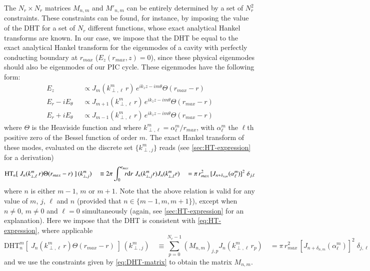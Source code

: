 The $N_r\times N_r$ matrices $M_{n,m}$ and $M'_{n,m}$ can be entirely
determined by a set of $N_r^2$ constraints. These
constraints can be found, for instance, by imposing the value of the
DHT for a set of $N_r$ different functions, whose exact analytical Hankel
transforms are known. In our case, we impose that the DHT be equal to the exact analytical
Hankel transform for the eigenmodes of a cavity with
perfectly conducting boundary at $r_{max}$ ($E_z(r_{max},z) =
0$), since these physical eigenmodes should also be eigenmodes of our
PIC cycle. These eigenmodes have the following form:
\begin{align*}
E_z \;& \; \propto  J_m(k^m_{\perp,\ell} \,r)\,e^{ik_z z -im\theta} \Theta(r_{max}-r) \\
E_r -i E_\theta \;& \; \propto  J_{m+1}(k^m_{\perp,\ell} \,r) \,e^{ik_z z -im\theta} \Theta(r_{max}-r)\\
E_r +i E_\theta \;& \; \propto  J_{m-1}(k^m_{\perp,\ell} \,r)
                    \,e^{ik_z z -im\theta} \Theta(r_{max}-r) 
\end{align*}
where $\Theta$ is the Heaviside function and where $k^m_{\perp,\ell} =
\alpha^m_\ell / r_{max}$, with $\alpha^m_\ell$ the $\ell$th positive zero of
the Bessel function of order $m$. 
The exact Hankel transform of these modes, evaluated on the discrete set
$\{k^m_{\perp,j} \}$ reads (see \ref{sec:HT-expression} for a derivation)
\begin{equation} 
\label{eq:HT-expression}
\mathrm{HT}_{n}[ \; J_n(k^m_{\perp,\ell} \,r)  \Theta(r_{max}-r)  \;] \,(k^m_{\perp,j} )
\quad \equiv 2\pi \int_{0}^{r_{max}} \!\!\!\!\! r\mathrm{d}r \; J_n (k^m_{\perp,j} r) J_n (k^m_{\perp,\ell} r)
\quad = \pi\, r_{max}^2\,[ J_{n+\delta_{n,m}}(\alpha_\ell^m)]^2 \;\delta_{j,\ell} 
\end{equation}
where $n$ is either $m-1$, $m$ or $m+1$. Note that the above relation
is valid for any value of $m$, $j$, $\ell$ and $n$ (provided that $n\in \{m-1,m,m+1\}$), except when $n
\neq 0$, $m \neq 0$ and $\ell = 0$ simultaneously (again, see
\ref{sec:HT-expression} for an explanation). Here we impose that the DHT is consistent with
\cref{eq:HT-expression}, where applicable
\begin{equation}
\label{eq:DHT-matrix}
\mathrm{DHT}^m_{n}[ \; J_n(k^m_{\perp,\ell} \,r) \Theta(r_{max}-r)  \;] \,(k^m_{\perp,j}) 
\quad \equiv \sum_{p=0}^{N_r-1} (M_{n,m})_{j,p}
  J_n(k^m_{\perp,\ell}\,r_p) 
\quad = \pi\, r_{max}^2\,[ J_{n+\delta_{n,m}}(\alpha_\ell^m)]^2 \; \delta_{j,\ell} 
\end{equation}
\noindent and we use the constraints given by \cref{eq:DHT-matrix} to
obtain the matrix $M_{n,m}$.

